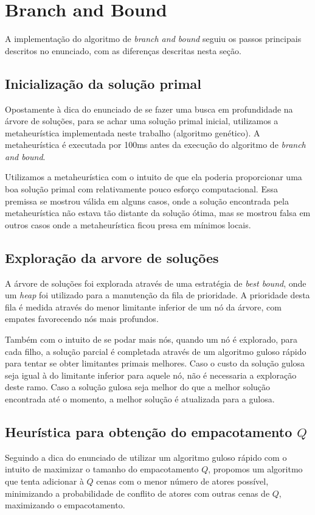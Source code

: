 \documentclass[a4paper,11pt]{article}
\begin{document}
\section{Branch and Bound}
A implementação do algoritmo de \textit{branch and bound} seguiu os passos principais
descritos no enunciado, com as diferenças descritas nesta seção.

\subsection{Inicialização da solução primal}
Opostamente à dica do enunciado de se fazer uma busca em profundidade na árvore
de soluções, para se achar uma solução primal inicial, utilizamos a metaheurística
implementada neste trabalho (algoritmo genético). A metaheurística é executada
por 100ms antes da execução do algoritmo de \textit{branch and bound}.

Utilizamos a metaheurística com o intuito de que ela poderia proporcionar uma
boa solução primal com relativamente pouco esforço computacional. Essa premissa
se mostrou válida em alguns casos, onde a solução encontrada pela metaheurística
não estava tão distante da solução ótima, mas se mostrou falsa em outros casos
onde a metaheurística ficou presa em mínimos locais.

\subsection{Exploração da arvore de soluções}
A árvore de soluções foi explorada através de uma estratégia de \textit{best bound},
onde um \textit{heap} foi utilizado para a manutenção da fila de prioridade. A prioridade
desta fila é medida através do menor limitante inferior de um nó da árvore, com empates favorecendo
nós mais profundos.

Também com o intuito de se podar mais nós, quando um nó é explorado, para cada filho,
a solução parcial é completada através de um algoritmo guloso rápido para tentar se obter
limitantes primais melhores. Caso o custo da solução gulosa seja igual à do limitante
inferior para aquele nó, não é necessaria a exploração deste ramo. Caso a solução gulosa seja melhor
do que a melhor solução encontrada até o momento, a melhor solução é atualizada
para a gulosa.

\subsection{Heurística para obtenção do empacotamento $Q$}
Seguindo a dica do enunciado de utilizar um algoritmo guloso rápido com o intuito
de maximizar o tamanho do empacotamento $Q$, propomos um algoritmo que tenta
adicionar à $Q$ cenas com o menor número de atores possível, minimizando a probabilidade
de conflito de atores com outras cenas de $Q$, maximizando o empacotamento.
\end{document}
